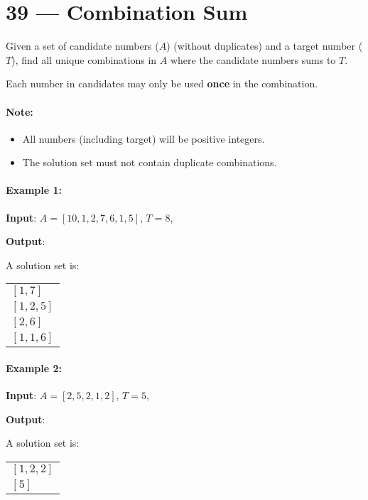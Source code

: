 \section{39 --- Combination Sum}
Given a set of candidate numbers ($A$) (without duplicates) and a target number ($T$), find all unique combinations in $A$ where the candidate numbers sums to $T$.

Each number in candidates may only be used \textbf{once} in the combination.

\paragraph{Note:}

\begin{itemize}
\item All numbers (including target) will be positive integers.
\item The solution set must not contain duplicate combinations.
\end{itemize}

\paragraph{Example 1:}

\begin{flushleft}
\textbf{Input}: $A = [10,1,2,7,6,1,5]$, $T = 8$,

\textbf{Output}:

A solution set is:

\begin{table}[H]
\begin{tabular}{l}
$ [1, 7] $ \\
$ [1, 2, 5] $ \\
$ [2, 6] $ \\
$ [1, 1, 6] $
\end{tabular}
\end{table}

\end{flushleft}

\paragraph{Example 2:}

\begin{flushleft}
\textbf{Input}: $A = [2,5,2,1,2]$, $T = 5$,

\textbf{Output}:

A solution set is:

\begin{table}[H]
\begin{tabular}{l}
$[1,2,2]$ \\
$[5]$ 
\end{tabular}
\end{table}
\end{flushleft}

